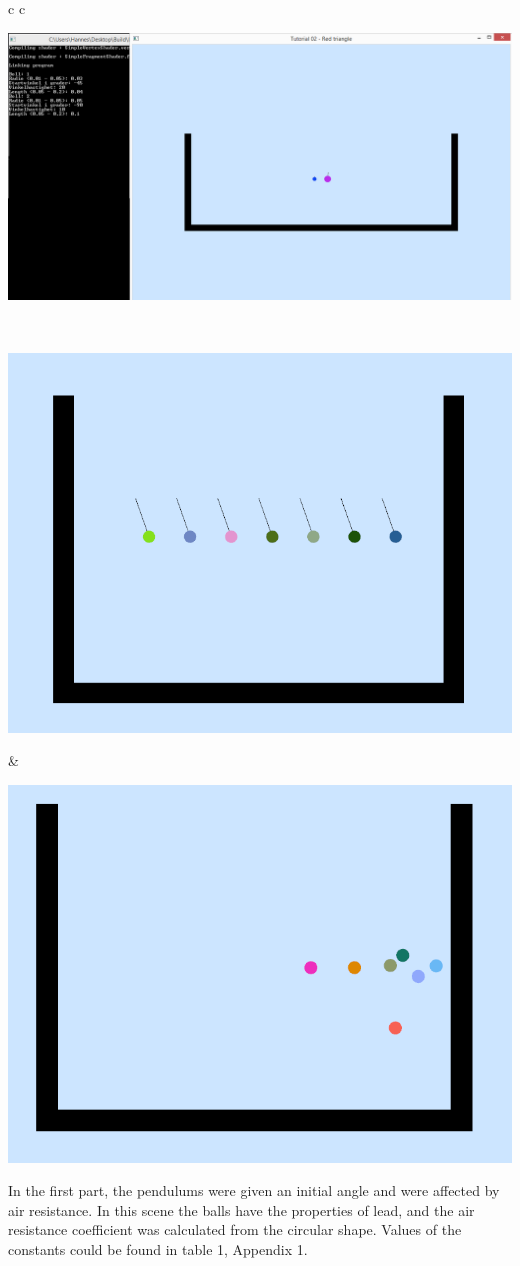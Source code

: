 \documentclass[a4paper,12pt,twoside,english]{article}
\begin{document}
\begin{table}[h!]
  \centering
   \begin{tabular}{c c}
      {\begin{minipage}{0.5\textwidth}
      \includegraphics[width=\linewidth]{bilder/ConsoleAndProgram.png}
      \centering
      \captionsetup{justification=centering, singlelinecheck=false}
    \end{minipage} } 
      \\
     \begin{minipage}{0.5\textwidth}
      \includegraphics[width=\linewidth, width=60mm]{bilder/OpenGL_pendulum1.png}
      \centering
    \end{minipage} 
    & 
    \begin{minipage}{0.5\textwidth}
      \includegraphics[width=\linewidth, width=60mm]{bilder/OpenGL_bounce1.png}
      \centering
    \end{minipage} 
  \end{tabular}
\end{table}
In the first part, the pendulums were given an initial angle and were affected by air resistance. In this scene the balls have the properties of lead, and the air resistance coefficient was calculated from the circular shape.  Values of the constants could be found in table 1, Appendix 1.
\end{document}

